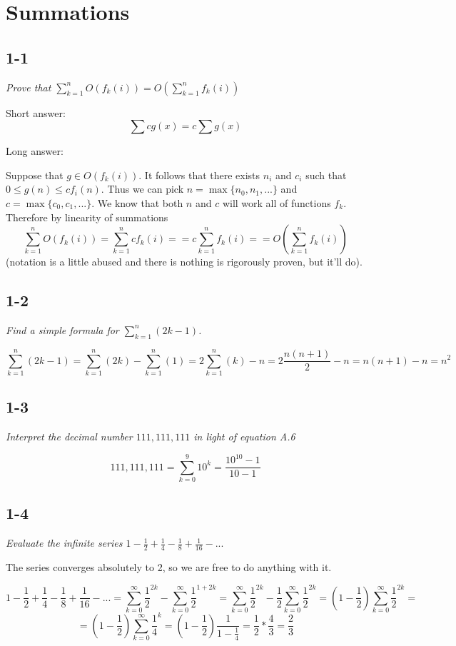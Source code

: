 \documentclass[11pt,oneside,titlepage]{book}
\begin{document}
\chapter{Summations}

\section*{1-1}
\textit{Prove that $\sum_{k  = 1}^n{O(f_k(i))} = O(\sum_{k  = 1}^n{f_k(i)})$}

Short answer:
$$\sum cg(x) = c\sum{g(x)}$$

Long answer:

Suppose that $g \in O(f_k(i))$. It follows that there exists $n_i$ and $c_i$
such that $0 \leq g(n) \leq cf_i(n)$. Thus we can pick
$n = \max\{n_0, n_1, ...\}$ and $c = \max\{c_0, c_1, ... \}$. We know that
both $n$ and $c$ will work all of functions $f_k$. Therefore by
linearity of summations
$$\sum_{k  = 1}^n{O(f_k(i))}
= \sum_{k  = 1}^n{cf_k(i)} =
= c\sum_{k  = 1}^n{f_k(i)} = 
= O(\sum_{k  = 1}^n{f_k(i)})$$
(notation is a little abused and there is nothing is rigorously
proven, but it'll do).

\section*{1-2}
\textit{Find a simple formula for $\sum_{k = 1}^n{(2k - 1)}$.}

$$\sum_{k = 1}^n{(2k - 1)} =
\sum_{k = 1}^n{(2k)} - \sum_{k = 1}^n{(1)} =
2\sum_{k = 1}^n{(k)} - n =
2\frac{n(n + 1)}{2} - n =
n(n + 1) - n =
n^2
$$


\section*{1-3}
\textit{Interpret the decimal number $111,111,111$ in light of equation A.6}

$$111,111,111 = \sum_{k = 0}^{9}{10^k} = \frac{10^{10} - 1}{10 - 1}$$

\section*{1-4}
\textit{Evaluate the infinite series $1 - \frac 1 2 + \frac 1 4 - \frac 1 8
  + \frac{1}{16} - ...$}

The series converges absolutely to 2, so we are free to do anything with it.

$$1 - \frac 1 2 + \frac 1 4 - \frac 1 8
+ \frac{1}{16} - ... = 
\sum_{k = 0}^{\infty}{\frac{1}{2}^{2k}}
- \sum_{k = 0}^{\infty}{\frac{1}{2}^{1 + 2k}} =
\sum_{k = 0}^{\infty}{\frac{1}{2}^{2k}}
- \frac{1}{2}\sum_{k = 0}^{\infty}{\frac{1}{2}^{2k}} =
\left(1 - \frac{1}{2}\right)\sum_{k = 0}^{\infty}{\frac{1}{2}^{2k}} = 
$$
$$
= \left(1 - \frac{1}{2}\right)\sum_{k = 0}^{\infty}{\frac{1}{4}^{k}}
= \left(1 - \frac{1}{2}\right)\frac{1}{1 - \frac{1}{4}}
= \frac 1 2 *  \frac 4 3 = \frac 2 3
$$
\end{document}
